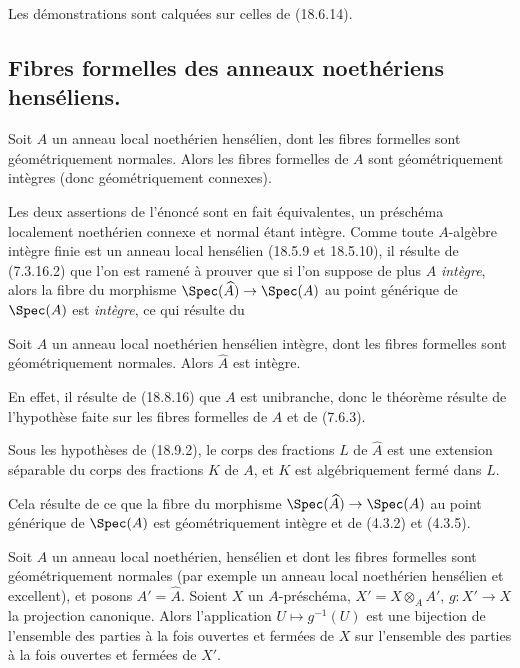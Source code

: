 Les démonstrations sont calquées sur celles de (18.6.14).

\subsection{Fibres formelles des anneaux noethériens henséliens.}
\label{subsection:IV.18.9}

\begin{theorem}[18.9.1]
\label{IV.18.9.1}
Soit $A$ un anneau local noethérien hensélien, dont les fibres formelles sont géométriquement normales. Alors les fibres formelles de $A$ sont géométriquement intègres (donc géométriquement connexes).
\end{theorem}

Les deux assertions de l'énoncé sont en fait équivalentes, un préschéma localement noethérien connexe et normal étant intègre. Comme toute $A$-algèbre intègre finie est un anneau local hensélien (18.5.9 et 18.5.10), il résulte de (7.3.16.2) que l'on est ramené à prouver que si l'on suppose de plus $A$ \emph{intègre}, alors la fibre du morphisme $\Spec(\widehat A)\to\Spec(A)$ au point générique de $\Spec(A)$ est \emph{intègre}, ce qui résulte du

\begin{corollary}[18.9.2]
\label{IV.18.9.2}
Soit $A$ un anneau local noethérien hensélien intègre, dont les fibres formelles sont géométriquement normales. Alors $\widehat A$ est intègre.
\end{corollary}

En effet, il résulte de (18.8.16) que $A$ est unibranche, donc le théorème résulte de l'hypothèse faite sur les fibres formelles de $A$ et de (7.6.3).

\begin{corollary}[18.9.3]
\label{IV.18.9.3}
Sous les hypothèses de (18.9.2), le corps des fractions $L$ de $\widehat A$ est une extension séparable du corps des fractions $K$ de $A$, et $K$ est algébriquement fermé dans $L$.
\end{corollary}

Cela résulte de ce que la fibre du morphisme $\Spec(\widehat A)\to\Spec(A)$ au point générique de $\Spec(A)$ est géométriquement intègre et de (4.3.2) et (4.3.5).

\begin{corollary}[18.9.4]
\label{IV.18.9.4}
Soit $A$ un anneau local noethérien, hensélien et dont les fibres formelles sont géométriquement normales (par exemple un anneau local noethérien hensélien et excellent), et posons $A'=\widehat A$. Soient $X$ un $A$-préschéma, $X'=X\otimes_A A'$, $g:X'\to X$ la projection canonique. Alors l'application $U\mapsto g^{-1}(U)$ est une bijection de l'ensemble des parties à la fois ouvertes et fermées de $X$ sur l'ensemble des parties à la fois ouvertes et fermées de $X'$.
\end{corollary}

